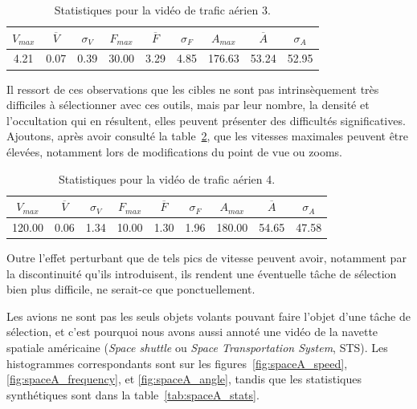 \begin{table}
	\centering
	\begin{tabular}{c c c c c c c c c}
		$V_{max}$	& $\overline{V}$	& $\sigma_{V}$	& $F_{max}$	& $\overline{F}$	& $\sigma_{F}$	& $A_{max}$	& $\overline{A}$	& $\sigma_{A}$	\bigstrut[b] \\ \hline

		4.21		& 0.07				& 0.39			& 30.00		& 3.29				& 4.85			& 176.63	& 53.24				& 52.95			\bigstrut[t] \\
	\end{tabular}
	\caption[Statistiques pour la vidéo  de trafic aérien 3]{Statistiques pour la vidéo  de trafic aérien 3.}
	\label{tab:hkg_stats}
\end{table}

	Il ressort de ces observations que les cibles ne sont pas intrinsèquement très difficiles à sélectionner avec ces outils, mais par leur nombre, la densité et l'occultation qui en résultent, elles peuvent présenter des difficultés significatives. Ajoutons, après avoir consulté la table~\ref{tab:flightradar2a_stats}, que les vitesses maximales peuvent être élevées, notamment lors de modifications du point de vue ou zooms.

\begin{table}
	\centering
	\begin{tabular}{c c c c c c c c c}
		$V_{max}$	& $\overline{V}$	& $\sigma_{V}$	& $F_{max}$	& $\overline{F}$	& $\sigma_{F}$	& $A_{max}$	& $\overline{A}$	& $\sigma_{A}$	\bigstrut[b] \\ \hline

		120.00		& 0.06				& 1.34			& 10.00		& 1.30				& 1.96			& 180.00	& 54.65				& 47.58			\bigstrut[t] \\
	\end{tabular}
	\caption[Statistiques pour la vidéo  de trafic aérien 4]{Statistiques pour la vidéo  de trafic aérien 4.}
	\label{tab:flightradar2a_stats}
\end{table}

	Outre l'effet perturbant que de tels pics de vitesse peuvent avoir, notamment par la discontinuité qu'ils introduisent, ils rendent une éventuelle tâche de sélection bien plus difficile, ne serait-ce que ponctuellement.
	
	Les avions ne sont pas les seuls objets volants pouvant faire l'objet d'une tâche de sélection, et c'est pourquoi nous avons aussi annoté une vidéo de la navette spatiale américaine (\emph{Space shuttle} ou \emph{Space Transportation System}, STS). Les histogrammes correspondants sont sur les figures~\ref{fig:spaceA_speed}, \ref{fig:spaceA_frequency}, et \ref{fig:spaceA_angle}, tandis que les statistiques synthétiques sont dans la table~\ref{tab:spaceA_stats}.
	
